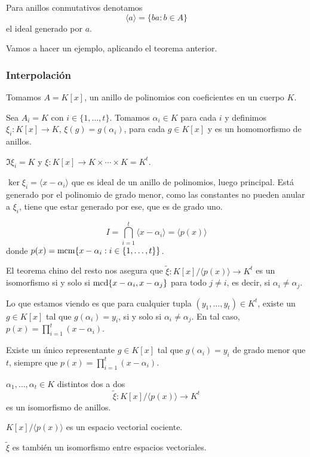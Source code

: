 
\begin{obs}
  Para anillos conmutativos denotamos
  \[
    \langle a\rangle=\{ba:b\in A\}
  \]
  el ideal generado por \(a\).
\end{obs}

Vamos a hacer un ejemplo, aplicando el teorema anterior.

\subsubsection{Interpolación}         

Tomamos \(A=K[x]\), un anillo de polinomios con coeficientes en un
cuerpo \(K\).

Sea \(A_i = K\) con \(i\in\{1,\ldots,t\}\).
Tomamos \(\alpha_i\in K\) para cada \(i\) y definimos
\(\xi_i:K[x]\longrightarrow K\), \(\xi(g)=g(\alpha_i)\),
para cada \(g\in K[x]\) y es un homomorfismo de anillos.

\(\Im \xi_i=K\) y \(\xi:K[x]\longrightarrow K\times
\cdots \times K=K^t\).

\(\ker \xi_i=\langle x-\alpha_i\rangle\) que es ideal de un anillo de
polinomios, luego principal. Está generado por el polinomio de grado menor,
como las constantes no pueden anular a \(\xi_i\), tiene que estar generado
por ese, que es de grado uno.

\[
  I=\bigcap_{i=1}^t\langle x-\alpha_i\rangle =\langle p(x)\rangle
\]
donde \(p(x)=\operatorname{mcm}\{x-\alpha_i: i\in\{1,\ldots, t\}\}\).


El teorema chino del resto nos asegura que \(\tilde{\xi}:
K[x]/\langle p(x)\rangle\longrightarrow K^t\) es un isomorfismo si y solo si
\(\operatorname{mcd}\{x-\alpha_i, x-\alpha_j\}\) para todo \(j\neq i\), es decir,
si \(\alpha_i\neq \alpha_j\).

Lo que estamos viendo es que para cualquier tupla
\((y_1,\ldots, y_t)\in K^t\), existe un \(g\in K[x]\) tal que
\(g(\alpha_i)=y_i\), si y solo si \(\alpha_i\neq\alpha_j\). En tal
caso, \(p(x)=\prod_{i=1}^t(x-\alpha_i)\).

Existe un único representante \(g\in K[x]\) tal que \(g(\alpha_i)=y_i\)
de grado menor que \(t\), siempre que
\(p(x)=\prod_{i=1}^t(x-\alpha_i)\).

\(\alpha_1,\ldots,\alpha_t\in K\) distintos dos a dos
\[
  \tilde{\xi}:K[x]/\langle p(x)\rangle\longrightarrow K^t
\]
es un isomorfismo de anillos.

\(K[x]/\langle p(x)\rangle\) es un espacio vectorial cociente.

\(\tilde{\xi}\) es también un isomorfismo entre espacios vectoriales.

